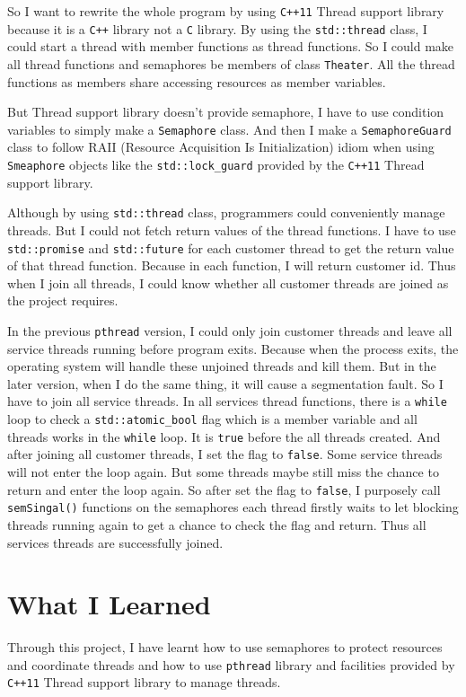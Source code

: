 \documentclass[a4paper]{report}
\begin{document}
So I want to rewrite the whole program by using \lstinline{C++11} Thread support library because it is a \lstinline{C++} library not a \lstinline{C} library. By using the \lstinline{std::thread} class, I could start a thread with member functions as thread functions. So I could make all thread functions and semaphores be members of class \lstinline{Theater}. All the thread functions as members share accessing resources as member variables.

But Thread support library doesn't provide semaphore, I have to use condition variables to simply make a \lstinline{Semaphore} class. And then I make a \lstinline{SemaphoreGuard} class to follow RAII (Resource Acquisition Is Initialization) idiom when using \lstinline{Smeaphore} objects like the \lstinline{std::lock_guard} provided by the \lstinline{C++11} Thread support library.

Although by using \lstinline{std::thread} class, programmers could conveniently manage threads. But I could not fetch return values of the thread functions. I have to use \lstinline{std::promise} and \lstinline{std::future} for each customer thread to get the return value of that thread function. Because in each function, I will return customer id. Thus when I join all threads, I could know whether all customer threads are joined as the project requires.

In the previous \lstinline{pthread} version, I could only join customer threads and leave all service threads running before program exits. Because when the process exits, the operating system will handle these unjoined threads and kill them. But in the later version, when I do the same thing, it will cause a segmentation fault. So I have to join all service threads. In all services thread functions, there is a \lstinline{while} loop to check a \lstinline{std::atomic_bool} flag which is a member variable and all threads works in the \lstinline{while} loop. It is \lstinline{true} before the all threads created. And after joining all customer threads, I set the flag to \lstinline{false}. Some service threads will not enter the loop again. But some threads maybe still miss the chance to return and enter the loop again. So after set the flag to \lstinline{false}, I purposely call \lstinline{semSingal()} functions on the semaphores each thread firstly waits to let blocking threads running again to get a chance to check the flag and return. Thus all services threads are successfully joined.

\section*{What I Learned}
Through this project, I have learnt how to use semaphores to protect resources and coordinate threads and how to use \lstinline{pthread} library and facilities provided by \lstinline{C++11} Thread support library to manage threads.
\end{document}
